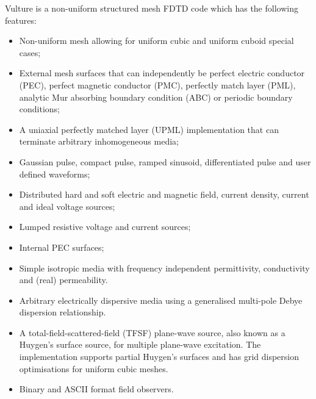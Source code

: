 \documentclass[onecolumn,a4paper]{article}
\numberwithin{equation}{section}
\begin{document}
Vulture is a non-uniform structured mesh FDTD code which has the following features:
\begin{itemize}
 \item Non-uniform mesh allowing for uniform cubic and uniform cuboid special cases;
 \item External mesh surfaces that can independently be perfect electric conductor (PEC), 
 perfect magnetic conductor (PMC), perfectly match layer (PML), analytic Mur absorbing
 boundary condition (ABC) or periodic boundary conditions;
 \item A uniaxial perfectly matched layer (UPML) implementation that can terminate arbitrary inhomogeneous media;
 \item Gaussian pulse, compact pulse, ramped sinusoid, differentiated pulse and user defined waveforms;
 \item Distributed hard and soft electric and magnetic field, current density, current and ideal voltage sources;
 \item Lumped resistive voltage and current sources;
 \item Internal PEC surfaces;
 \item Simple isotropic media with frequency independent permittivity, conductivity and (real) permeability.
 \item Arbitrary electrically dispersive media using a generalised multi-pole Debye dispersion relationship.
 \item A total-field-scattered-field (TFSF) plane-wave source, also known as a Huygen's surface source, 
       for multiple plane-wave excitation. The implementation supports partial Huygen's surfaces
       and has grid dispersion optimisations for uniform cubic meshes.  
 \item Binary and ASCII format field observers.
\end{itemize}
\end{document}

